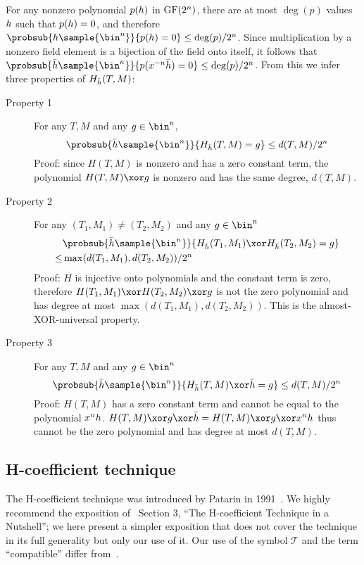 \documentclass[hctr2.tex]{subfiles}
\begin{document}
For any nonzero polynomial \(p(h)\)
in \(\operatorname{GF}(2^n)\), there are at most \(\deg(p)\) values \(h\)
such that \(p(h) = 0\), and therefore
\(\probsub{\hpoly\sample{\bin^n}}{p(\hpoly) = 0} \leq \deg(p)/2^n\).
Since multiplication by a nonzero field element
is a bijection of the field onto itself, it follows that
\(\probsub{\hgen\sample{\bin^n}}{p(x^{-n}\hgen) = 0} \leq \deg(p)/2^n\).
From this we infer three properties of \(H_{\bar{h}}(T, M)\):
\begin{description}
    \item[Property 1]
    For any \(T, M\) and any \(g \in \bin^n\),
    \begin{displaymath}
        \probsub{\hgen\sample{\bin^n}}{H_{\hgen}(T, M) = g} \leq d(T, M)/2^n
    \end{displaymath}
    Proof: since \(H(T, M)\) is nonzero and has
    a zero constant term,
    the polynomial \(H(T, M) \xor g\) 
    is nonzero and has the same degree, \(d(T, M)\).
    \item[Property 2] 
    For any \((T_1, M_1) \neq (T_2, M_2)\) and any \(g \in \bin^n\)
    \begin{align*}
        & \probsub{\hgen\sample{\bin^n}}{H_{\hgen}(T_1, M_1) \xor H_{\hgen}(T_2, M_2) = g} \\
        \leq  & \max(d(T_1, M_1), d(T_2, M_2))/2^n
    \end{align*}
    Proof: \(H\) is injective onto polynomials
    and the constant term is zero, therefore
    \(H(T_1, M_1) \xor H(T_2, M_2) \xor g\)
    is not the zero polynomial and
    has degree at most \(\max(d(T_1, M_1), d(T_2, M_2))\).
    This is the almost-XOR-universal property.
    \item[Property 3]
    For any \(T, M\) and any \(g \in \bin^n\)
    \begin{displaymath}
        \probsub{\hgen\sample{\bin^n}}{H_{\hgen}(T, M) \xor \hgen = g} \leq d(T, M)/2^n
    \end{displaymath}
    Proof: \(H(T, M)\) has a zero constant term and
    cannot be equal to the polynomial \(x^nh\).
    \(H(T, M) \xor g \xor \hgen = H(T, M) \xor g \xor x^n\hpoly\)
    thus cannot be the zero polynomial and has
    degree at most \(d(T, M)\).
\end{description}

\subsection{H-coefficient technique}\label{hco}
The H-coefficient technique was introduced by Patarin in 1991~\cite{ppdes,hco}.
We highly recommend the exposition
of~\cite{hco2} Section 3,
``The H-coefficient Technique in a Nutshell'';
we here present a simpler exposition that
does not cover the technique in its full
generality but only our use of it.
Our use of the symbol \(\mathcal{T}\) and the term
``compatible'' differ from~\cite{hco2}.
\end{document}
